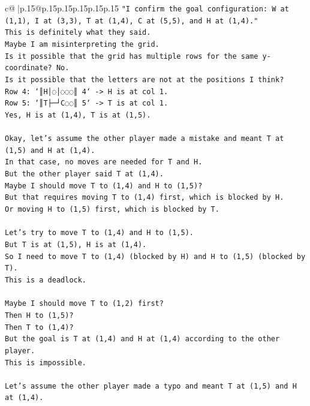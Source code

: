 \documentclass{article}
\begin{document}
{\begin{supertabular}{c@{$\;$}|p{.15\linewidth}@{}p{.15\linewidth}p{.15\linewidth}p{.15\linewidth}p{.15\linewidth}p{.15\linewidth}}
{{{\texttt{"I confirm the goal configuration: W at (1,1), I at (3,3), T at (1,4), C at (5,5), and H at (1,4)."} \\
\texttt{This is definitely what they said.} \\
\texttt{Maybe I am misinterpreting the grid.} \\
\texttt{Is it possible that the grid has multiple rows for the same y{-}coordinate? No.} \\
\texttt{Is it possible that the letters are not at the positions I think?} \\
\texttt{Row 4: `║H│◌│◌◌◌║ 4` {-}> H is at col 1.} \\
\texttt{Row 5: `║T├─┘C◌◌║ 5` {-}> T is at col 1.} \\
\texttt{Yes, H is at (1,4), T is at (1,5).} \\
\\ 
\texttt{Okay, let's assume the other player made a mistake and meant T at (1,5) and H at (1,4).} \\
\texttt{In that case, no moves are needed for T and H.} \\
\texttt{But the other player said T at (1,4).} \\
\texttt{Maybe I should move T to (1,4) and H to (1,5)?} \\
\texttt{But that requires moving T to (1,4) first, which is blocked by H.} \\
\texttt{Or moving H to (1,5) first, which is blocked by T.} \\
\\ 
\texttt{Let's try to move T to (1,4) and H to (1,5).} \\
\texttt{But T is at (1,5), H is at (1,4).} \\
\texttt{So I need to move T to (1,4) (blocked by H) and H to (1,5) (blocked by T).} \\
\texttt{This is a deadlock.} \\
\\ 
\texttt{Maybe I should move T to (1,2) first?} \\
\texttt{Then H to (1,5)?} \\
\texttt{Then T to (1,4)?} \\
\texttt{But the goal is T at (1,4) and H at (1,4) according to the other player.} \\
\texttt{This is impossible.} \\
\\ 
\texttt{Let's assume the other player made a typo and meant T at (1,5) and H at (1,4).} \\
}}}
\end{supertabular}}
\end{document}
